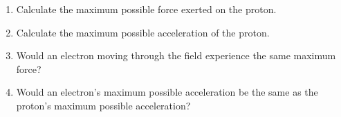 \documentclass[letterpaper, 12pt]{article}
\begin{document}
\begin{enumerate}
\begin{enumerate}
			\item Calculate the maximum possible force exerted on the proton.
			\vspace{.4in}
			
			
			\item Calculate the maximum possible acceleration of the proton.
			
				\vspace{.4in}
			
			\item Would an electron moving through the field experience the same maximum force?
				\vspace{.4in}
			
			\item Would an electron's maximum possible acceleration be the same as the proton's maximum possible acceleration? 
			
		\end{enumerate}
	


	
\end{enumerate}
 
\end{document}

